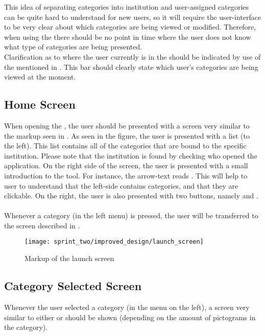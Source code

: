 This idea of separating categories into institution and user-assigned categories can be quite hard to understand for new users, so it will require the user-interface to be very clear about which categories are being viewed or modified. Therefore, when using the \ct there should be no point in time where the user does not know what type of categories are being presented.\\

Clarification as to where the user currently is in the \ct should be indicated by use of the  mentioned in . This bar should clearly state which user's categories are being viewed at the moment.

\subsection{Home Screen}
\label{sec:home_screen}
When opening the \ct, the user should be presented with a screen very similar to the markup seen in . As seen in the figure, the user is presented with a list (to the left). This list contains all of the categories that are bound to the specific institution. Please note that the institution is found by checking who opened the application. On the right side of the screen, the user is presented with a small introduction to the tool. For instance, the arrow-text reads . This will help to user to understand that the left-side contains categories, and that they are clickable. On the right, the user is also presented with two buttons, namely  and .
\\\\
Whenever a category (in the left menu) is pressed, the user will be transferred to the screen described in .

\begin{figure}[!htbp]
    \centering
    \texttt{[image: sprint\_two/improved\_design/launch\_screen]}
    \caption{Markup of the launch screen}
    \label{fig:improved_design_launch_screen}
\end{figure}

\subsection{Category Selected Screen}
\label{sec:category_selected_screen}
Whenever the user selected a category (in the menu on the left), a screen very similar to either  or  should be shown (depending on the amount of pictograms in the category).\\


